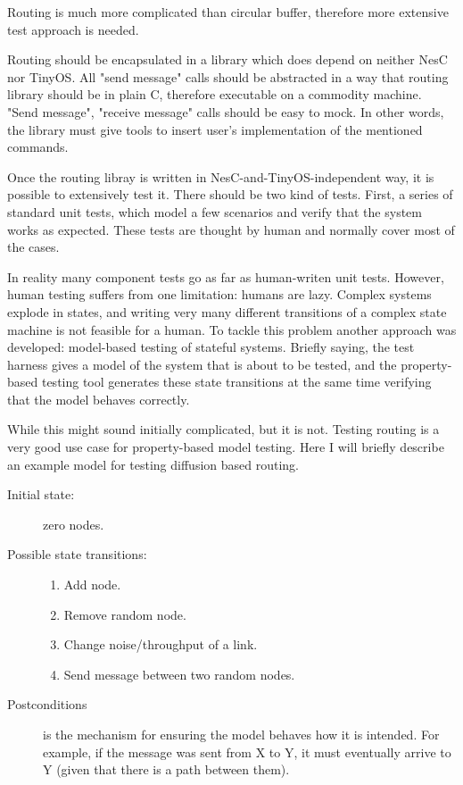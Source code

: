 \documentclass[english,11pt]{article}
\numberwithin{equation}{section}
\begin{document}
Routing is much more complicated than circular buffer, therefore more extensive
test approach is needed.

Routing should be encapsulated in a library which does depend on neither NesC
nor TinyOS. All "send message" calls should be abstracted in a way that routing
library should be in plain C, therefore executable on a commodity machine.
"Send message", "receive message" calls should be easy to mock. In other words,
the library must give tools to insert user's implementation of the mentioned
commands.

Once the routing libray is written in NesC-and-TinyOS-independent way, it is
possible to extensively test it. There should be two kind of tests. First, a
series of standard unit tests, which model a few scenarios and verify that the
system works as expected. These tests are thought by human and normally cover
most of the cases.

In reality many component tests go as far as human-writen unit tests. However,
human testing suffers from one limitation: humans are lazy. Complex systems
explode in states, and writing very many different transitions of a complex
state machine is not feasible for a human. To tackle this problem another
approach was developed: model-based testing of stateful
systems\cite{model-testing}. Briefly saying, the test harness gives a model of
the system that is about to be tested, and the property-based testing tool
generates these state transitions at the same time verifying that the model
behaves correctly.

While this might sound initially complicated, but it is not. Testing routing is
a very good use case for property-based model testing. Here I will briefly
describe an example model for testing diffusion based routing.

\begin{description}
    \item[Initial state:] zero nodes.
    \item[Possible state transitions:]
        \begin{enumerate}
            \item Add node.
            \item Remove random node.
            \item Change noise/throughput of a link.
            \item Send message between two random nodes.
        \end{enumerate}
    \item[Postconditions] is the mechanism for ensuring the model behaves how it
        is intended. For example, if the message was sent from X to Y, it must
        eventually arrive to Y (given that there is a path between them).
\end{description}
\end{document}
